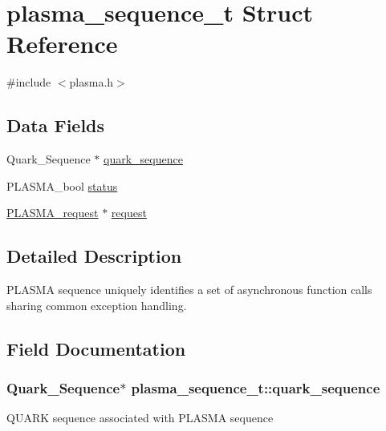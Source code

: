 \hypertarget{structplasma__sequence__t}{}\section{plasma\+\_\+sequence\+\_\+t Struct Reference}
\label{structplasma__sequence__t}


{\ttfamily \#include $<$plasma.\+h$>$}

\subsection*{Data Fields}
\begin{DoxyCompactItemize}
\item 
Quark\+\_\+\+Sequence $\ast$ \hyperlink{structplasma__sequence__t_adbb9dd90ccf8b3bcd99194e90f0187c4_adbb9dd90ccf8b3bcd99194e90f0187c4}{quark\+\_\+sequence}
\item 
P\+L\+A\+S\+M\+A\+\_\+bool \hyperlink{structplasma__sequence__t_adf37ddea62dfaaa498c0defe68be01a4_adf37ddea62dfaaa498c0defe68be01a4}{status}
\item 
\hyperlink{structplasma__request__t}{P\+L\+A\+S\+M\+A\+\_\+request} $\ast$ \hyperlink{structplasma__sequence__t_a63c74296604414466c13fc935d9db565_a63c74296604414466c13fc935d9db565}{request}
\end{DoxyCompactItemize}


\subsection{Detailed Description}


 P\+L\+A\+S\+M\+A sequence uniquely identifies a set of asynchronous function calls sharing common exception handling. 

\subsection{Field Documentation}
\hypertarget{structplasma__sequence__t_adbb9dd90ccf8b3bcd99194e90f0187c4_adbb9dd90ccf8b3bcd99194e90f0187c4}{}
\subsubsection[{quark\+\_\+sequence}]{\setlength{\rightskip}{0pt plus 5cm}Quark\+\_\+\+Sequence$\ast$ plasma\+\_\+sequence\+\_\+t\+::quark\+\_\+sequence}\label{structplasma__sequence__t_adbb9dd90ccf8b3bcd99194e90f0187c4_adbb9dd90ccf8b3bcd99194e90f0187c4}
Q\+U\+A\+R\+K sequence associated with P\+L\+A\+S\+M\+A sequence \hypertarget{structplasma__sequence__t_a63c74296604414466c13fc935d9db565_a63c74296604414466c13fc935d9db565}{}
